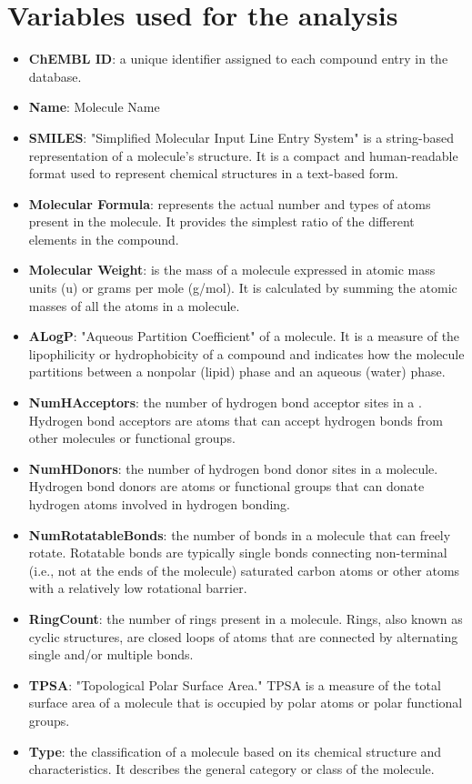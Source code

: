 \documentclass[10pt]{article}
\begin{document}
\section{Variables used for the analysis}
\begin{itemize}
  \item \textbf{ChEMBL ID}: a unique identifier assigned to each compound entry in the database.
  \item \textbf{Name}: Molecule Name
  \item \textbf{SMILES}: "Simplified Molecular Input Line Entry System" is a string-based
  representation of a molecule's structure. It is a compact and human-readable format used to represent chemical structures in a text-based form.
  \item \textbf{Molecular Formula}: represents the actual number and types of atoms present in the molecule. It provides the simplest ratio of the different elements in the compound.
  \item \textbf{Molecular Weight}: is the mass of a molecule expressed in atomic mass units (u) or grams per mole (g/mol). It is calculated by summing the atomic masses of all the atoms in a molecule.
  \item \textbf{ALogP}: "Aqueous Partition Coefficient" of a molecule. It is a measure of the lipophilicity or hydrophobicity of a compound and indicates how the molecule partitions between a nonpolar (lipid) phase and an aqueous (water) phase.
  \item \textbf{NumHAcceptors}: the number of hydrogen bond acceptor sites in a . Hydrogen bond acceptors are atoms that can accept hydrogen bonds from other molecules or functional groups.
  \item \textbf{NumHDonors}: the number of hydrogen bond donor sites in a molecule. Hydrogen bond donors are atoms or functional groups that can donate hydrogen atoms involved in hydrogen bonding.
  \item \textbf{NumRotatableBonds}: the number of bonds in a molecule that can freely rotate. Rotatable bonds are typically single bonds connecting non-terminal (i.e., not at the ends of the molecule) saturated carbon atoms or other atoms with a relatively low rotational barrier.
  \item \textbf{RingCount}: the number of rings present in a molecule. Rings, also known as cyclic structures, are closed loops of atoms that are connected by alternating single and/or multiple bonds.
  \item \textbf{TPSA}: "Topological Polar Surface Area." TPSA is a measure of the total surface area of a molecule that is occupied by polar atoms or polar functional groups.
  \item \textbf{Type}: the classification of a molecule based on its chemical structure and characteristics. It describes the general category or class of the molecule.
\end{itemize}
\end{document}
